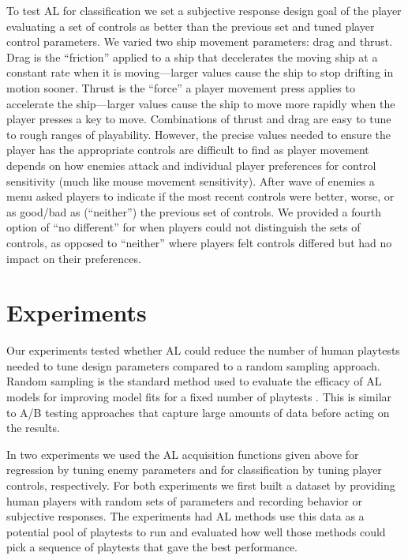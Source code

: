 \documentclass{sig-alternate}
\begin{document}
To test AL for classification we set a subjective response design goal of the player evaluating a set of controls as better than the previous set and tuned player control parameters.
We varied two ship movement parameters: drag and thrust. 
Drag is the ``friction'' applied to a ship that decelerates the moving ship at a constant rate when it is moving---larger values cause the ship to stop drifting in motion sooner. 
Thrust is the ``force'' a player movement press applies to accelerate the ship---larger values cause the ship to move more rapidly when the player presses a key to move. 
%
Combinations of thrust and drag are easy to tune to rough ranges of playability.
However, the precise values needed to ensure the player has the appropriate controls are difficult to find as player movement depends on how enemies attack and individual player preferences for control sensitivity (much like mouse movement sensitivity). 
After wave of enemies a menu asked players to indicate if the most recent controls were better, worse, or as good/bad as (``neither'') the previous set of controls.
We provided a fourth option of ``no different'' for when players could not distinguish the sets of controls, as opposed to ``neither'' where players felt controls differed but had no impact on their preferences.





\section{Experiments}
Our experiments tested whether AL could reduce the number of human playtests needed to tune design parameters compared to a random sampling approach.
Random sampling is the standard method used to evaluate the efficacy of AL models for improving model fits for a fixed number of playtests \cite{settles2012:al-book}. 
This is similar to A/B testing approaches that capture large amounts of data before acting on the results.

In two experiments we used the AL acquisition functions given above for regression by tuning enemy parameters and for classification by tuning player controls, respectively.
For both experiments we first built a dataset by providing human players with random sets of parameters and recording behavior or subjective responses.
The experiments had AL methods use this data as a potential pool of playtests to run and evaluated how well those methods could pick a sequence of playtests that gave the best performance.
\end{document}
